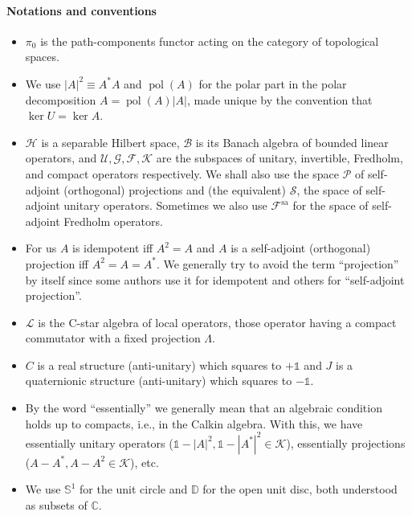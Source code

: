 \documentclass[a4paper,10pt]{article}
\numberwithin{equation}{section}
\theoremstyle{plain}
\theoremstyle{plain}
\theoremstyle{plain}
\theoremstyle{plain}
\theoremstyle{plain}
\theoremstyle{remark}
\theoremstyle{definition}
\theoremstyle{plain}
\newcommand{\bS}{\mathbb{S}}
\newcommand{\CC}{\mathbb{C}}
\newcommand{\calB}{\mathcal{B}}
\newcommand{\calF}{\mathcal{F}}
\newcommand{\calG}{\mathcal{G}}
\newcommand{\calU}{\mathcal{U}}
\newcommand{\calSU}{\mathcal{S}}
\newcommand{\calH}{\mathcal{H}}
\newcommand{\calK}{\mathcal{K}}
\newcommand{\calL}{\mathcal{L}}
\newcommand{\calP}{\mathcal{P}}
\newcommand{\Id}{\mathds{1}}
\newcommand{\quotes}[1]{``#1''}
\newcommand{\polar}{\operatorname{pol}}
\newcommand{\DD}{\mathbb{D}}
\begin{document}
	\paragraph{Notations and conventions}\begin{itemize}
		\item $\pi_0$ is the path-components functor acting on the category of topological spaces.
		\item We use $|A|^2\equiv A^\ast A$ and $\polar(A)$ for the polar part in the polar decomposition $A=\polar(A)|A|$, made unique by the convention that $\ker U = \ker A$.
		\item $\calH$ is a separable Hilbert space, $\calB$ is its Banach algebra of bounded linear operators, and $\calU,\calG,\calF,\calK$ are the subspaces of unitary, invertible, Fredholm, and compact operators respectively. We shall also use the space $\calP$ of self-adjoint (orthogonal) projections and (the equivalent) $\calSU$, the space of self-adjoint unitary operators. Sometimes we also use $\calF^{\mathrm{sa}}$ for the space of self-adjoint Fredholm operators.
		\item For us $A$ is idempotent iff $A^2=A$ and $A$ is a self-adjoint (orthogonal) projection iff $A^2=A=A^\ast$. We generally try to avoid the term \quotes{projection} by itself since some authors use it for idempotent and others for \quotes{self-adjoint projection}.
		\item $\calL$ is the C-star algebra of local operators, those operator having a compact commutator with a fixed projection $\Lambda$.
		\item $C$ is a real structure (anti-unitary) which squares to $+\Id$ and $J$ is a quaternionic structure (anti-unitary) which squares to $-\Id$.
		\item By the word ``essentially'' we generally mean that an algebraic condition holds up to compacts, i.e., in the Calkin algebra. With this, we have essentially unitary operators ($\Id-|A|^2,\Id-|A^\ast|^2\in\calK$), essentially projections ($A-A^\ast,A-A^2\in\calK$), etc.
		\item We use $\bS^1$ for the unit circle and $\DD$ for the open unit disc, both understood as subsets of $\CC$.
		
		
	\end{itemize}
	
\end{document}
